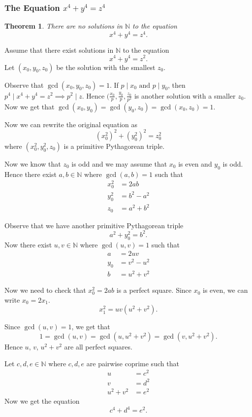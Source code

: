 \documentclass[11pt]{article}
\newtheorem{thm}{Theorem}[section]
\theoremstyle{definition}
\newcommand{\nl}[0]{\vspace{12pt}}
\newcommand{\et}[0]{\text{ and }}
\newcommand{\NN}{\mathbb{N}}
\begin{document}

\subsubsection{The Equation $x^4+y^4=z^4$}
	
\begin{thm}
	There are no solutions in $\NN$ to the equation
	$$ x^4 + y^4 = z^4. $$
\end{thm}
\proof
	Assume that there exist solutions in $\NN$ to the equation
	$$ x^4 + y^4 = z^2 . $$
	Let $(x_0, y_0, z_0)$ be the solution with the smallest $z_0$. 
	
	Observe that $\gcd(x_0,y_0,z_0) = 1$. 
	If $p\mid x_0 \et p\mid y_0$, then $p^4 \mid x^4 + y^4 = z^2 \implies p^2\mid z$. 
	Hence $(\frac{x_0}{p}, \frac{y_0}{p}, \frac{z_0}{p^2}$ is another solution with a smaller $z_0$. 
	Now we get that $\gcd(x_0,y_0) = \gcd(y_0,z_0) = \gcd(x_0,z_0) = 1$. 

	\nl
	Now we can rewrite the original equation as
	$$ (x_0^2)^2 + (y_0^2)^2 = z_0^2 $$
	where $(x_0^2, y_0^2, z_0)$ is a primitive Pythagorean triple.

	Now we know that $z_0$ is odd and we may assume that $x_0$ is even and $y_0$ is odd. 
	Hence there exist $a,b\in\NN$ where $\gcd(a,b)=1$ such that
	\begin{align*}
		x_0^2 &= 2ab \\
		y_0^2 &= b^2-a^2 \\
		z_0 &= a^2+b^2
	\end{align*}

	Observe that we have another primitive Pythagorean triple
	$$ a^2 + y_0^2 = b^2 . $$
	Now there exist $u,v\in\NN$ where $\gcd(u,v)=1$ such that 
	\begin{align*}
		a &= 2uv \\
		y_0 &= v^2-u^2 \\
		b &= u^2+v^2
	\end{align*}

	Now we need to check that $x_0^2 = 2ab$ is a perfect square.
	Since $x_0$ is even, we can write $x_0 = 2x_1$. 
	$$ x_1^2 = uv(u^2+v^2) . $$

	Since $\gcd(u,v) = 1$, we get that 
	$$ 1 = \gcd(u,v) = \gcd(u,u^2+v^2) = \gcd(v,u^2+v^2) . $$
	Hence $u$, $v$, $u^2+v^2$ are all perfect squares. 
	
	Let $c,d,e\in\NN$ where $c,d,e$ are pairwise coprime such that 
	\begin{align*}
		u &= c^2 \\
		v &= d^2 \\
		u^2+v^2 &= e^2
	\end{align*}
	Now we get the equation
	$$ c^4 + d^4 = e^2 . $$
\end{document}
